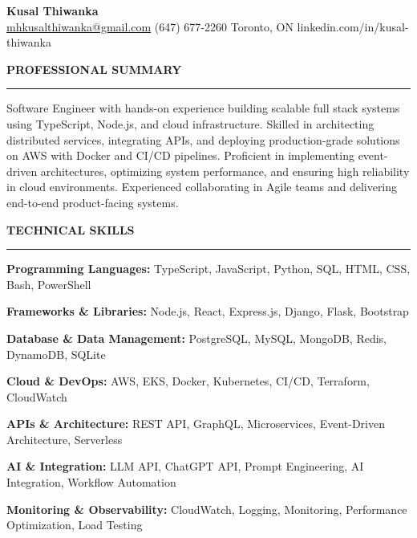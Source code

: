 \documentclass[10pt,letterpaper]{article}
\begin{document}
\begin{center}
{\LARGE\textbf{Kusal Thiwanka}}\\[3pt]
\href{mailto:mhkusalthiwanka@gmail.com}{mhkusalthiwanka@gmail.com}\hspace{2em}%
(647) 677{-}2260\hspace{2em}%
Toronto, ON\hspace{2em}
linkedin.com/in/kusal-thiwanka
\end{center}

\vspace{6pt}

\textbf{PROFESSIONAL SUMMARY}\\[-8pt]
\noindent\rule{\textwidth}{1pt}

\vspace{-2pt}

Software Engineer with hands-on experience building scalable full stack systems using TypeScript, Node.js, and cloud infrastructure. Skilled in architecting distributed services, integrating APIs, and deploying production-grade solutions on AWS with Docker and CI/CD pipelines. Proficient in implementing event-driven architectures, optimizing system performance, and ensuring high reliability in cloud environments. Experienced collaborating in Agile teams and delivering end-to-end product-facing systems.

\vspace{8pt}

\textbf{TECHNICAL SKILLS}\\[-8pt]
\noindent\rule{\textwidth}{1pt}

\vspace{-2pt}

\textbf{Programming Languages:} TypeScript, JavaScript, Python, SQL, HTML, CSS, Bash, PowerShell

\textbf{Frameworks \& Libraries:} Node.js, React, Express.js, Django, Flask, Bootstrap

\textbf{Database \& Data Management:} PostgreSQL, MySQL, MongoDB, Redis, DynamoDB, SQLite

\textbf{Cloud \& DevOps:} AWS, EKS, Docker, Kubernetes, CI/CD, Terraform, CloudWatch

\textbf{APIs \& Architecture:} REST API, GraphQL, Microservices, Event-Driven Architecture, Serverless

\textbf{AI \& Integration:} LLM API, ChatGPT API, Prompt Engineering, AI Integration, Workflow Automation

\textbf{Monitoring \& Observability:} CloudWatch, Logging, Monitoring, Performance Optimization, Load Testing
\end{document}
